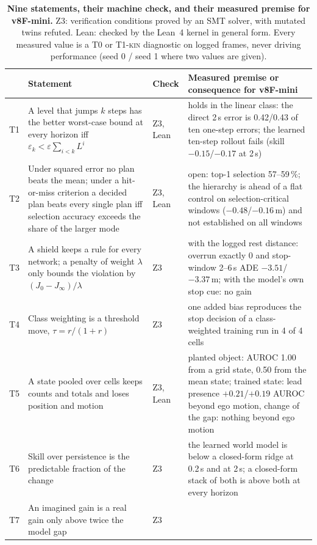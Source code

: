 \documentclass[10pt,twocolumn]{article}
\theoremstyle{remark}
\newcommand{\tier}[1]{\textsc{\small #1}}
\begin{document}
\begin{table}[t]
\centering
\caption{\textbf{Nine statements, their machine check, and their measured premise for v8F-mini.} Z3: verification conditions proved by
an SMT solver, with mutated twins refuted. Lean: checked by the Lean~4 kernel in general form. Every measured value is a \tier{T0} or
\tier{T1-kin} diagnostic on logged frames, never driving performance (seed 0 / seed 1 where two values are given).}
\label{tab:theory}
\small
\begin{tabularx}{\textwidth}{@{}l>{\raggedright\arraybackslash}p{60mm}l>{\raggedright\arraybackslash}X@{}}
\toprule
 & Statement & Check & Measured premise or consequence for v8F-mini \\
\midrule
T1 & A level that jumps $k$ steps has the better worst-case bound at every horizon iff $\varepsilon_k<\varepsilon\sum_{i<k}L^i$ & Z3, Lean &
holds in the linear class: the direct 2\,s error is 0.42/0.43 of ten one-step errors; the learned ten-step rollout fails (skill $-0.15$/$-0.17$ at 2\,s) \\
T2 & Under squared error no plan beats the mean; under a hit-or-miss criterion a decided plan beats every single plan iff selection accuracy exceeds the share of the larger mode & Z3, Lean &
open: top-1 selection 57--59\,\%; the hierarchy is ahead of a flat control on selection-critical windows ($-0.48$/$-0.16$\,m) and not established on all windows \\
T3 & A shield keeps a rule for every network; a penalty of weight $\lambda$ only bounds the violation by $(J_0-J_\infty)/\lambda$ & Z3 &
with the logged rest distance: overrun exactly 0 and stop-window 2--6\,s ADE $-3.51$/$-3.37$\,m; with the model's own stop cue: no gain \\
T4 & Class weighting is a threshold move, $\tau=r/(1+r)$ & Z3 &
one added bias reproduces the stop decision of a class-weighted training run in 4 of 4 cells \\
T5 & A state pooled over cells keeps counts and totals and loses position and motion & Z3, Lean &
planted object: AUROC 1.00 from a grid state, 0.50 from the mean state; trained state: lead presence $+0.21$/$+0.19$ AUROC beyond ego motion, change of the gap: nothing beyond ego motion \\
T6 & Skill over persistence is the predictable fraction of the change & Z3 &
the learned world model is below a closed-form ridge at 0.2\,s and at 2\,s; a closed-form stack of both is above both at every horizon \\
T7 & An imagined gain is a real gain only above twice the model gap & Z3 &

\end{tabularx}
\end{table}
\end{document}
